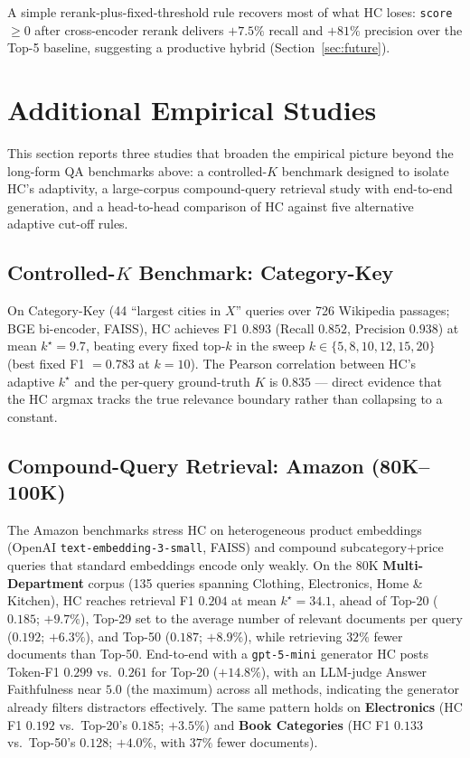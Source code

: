 \documentclass[letterpaper]{article}
\newcommand{\CatHCF}{0.893}
\newcommand{\CatHCR}{0.852}
\newcommand{\CatHCP}{0.938}
\newcommand{\CatHCK}{9.7}
\newcommand{\CatCorrK}{0.835}
\newcommand{\AmMdHCF}{0.204}
\newcommand{\AmMdHCK}{34.1}
\newcommand{\AmMdTwentyF}{0.185}
\newcommand{\AmMdAvgF}{0.192}
\newcommand{\AmMdFiftyF}{0.187}
\newcommand{\AmMdHCTokF}{0.299}
\newcommand{\AmMdTwentyTokF}{0.261}
\newcommand{\AmElHCF}{0.192}
\newcommand{\AmElTwentyF}{0.185}
\newcommand{\AmBkHCF}{0.133}
\newcommand{\AmBkFiftyF}{0.128}
\begin{document}
A simple rerank-plus-fixed-threshold rule recovers most of what HC
loses: \texttt{score $\ge 0$} after cross-encoder rerank delivers
$+7.5\%$ recall and $+81\%$ precision over the Top-5 baseline,
suggesting a productive hybrid (Section~\ref{sec:future}).

\section{Additional Empirical Studies}
\label{sec:prelim}

This section reports three studies that broaden the empirical
picture beyond the long-form QA benchmarks above: a controlled-$K$
benchmark designed to isolate HC's adaptivity, a large-corpus
compound-query retrieval study with end-to-end generation, and a
head-to-head comparison of HC against five alternative adaptive
cut-off rules.

\subsection{Controlled-$K$ Benchmark: Category-Key}
On Category-Key (44 ``largest cities in $X$'' queries over 726
Wikipedia passages; BGE bi-encoder, FAISS), HC achieves F1
$\CatHCF$ (Recall $\CatHCR$, Precision $\CatHCP$) at mean
$k^\star = \CatHCK$, beating every fixed top-$k$ in the sweep
$k \in \{5,8,10,12,15,20\}$ (best fixed F1 $= 0.783$ at $k{=}10$).
The Pearson correlation between HC's adaptive $k^\star$ and the
per-query ground-truth $K$ is $\CatCorrK$ --- direct evidence that
the HC argmax tracks the true relevance boundary rather than
collapsing to a constant.

\subsection{Compound-Query Retrieval: Amazon (80K--100K)}
\label{sec:amazon}
The Amazon benchmarks stress HC on heterogeneous product
embeddings (OpenAI \texttt{text-embedding-3-small}, FAISS) and
compound subcategory$+$price queries that standard embeddings
encode only weakly. On the 80K \textbf{Multi-Department} corpus
(135 queries spanning Clothing, Electronics, Home \& Kitchen), HC
reaches retrieval F1 $\AmMdHCF$ at mean $k^\star = \AmMdHCK$,
ahead of Top-20 ($\AmMdTwentyF$; $+9.7\%$), Top-29 set to the
average number of relevant documents per query ($\AmMdAvgF$;
$+6.3\%$), and Top-50 ($\AmMdFiftyF$; $+8.9\%$), while retrieving
$32\%$ fewer documents than Top-50. End-to-end with a
\texttt{gpt-5-mini} generator HC posts Token-F1 $\AmMdHCTokF$
vs.\ $\AmMdTwentyTokF$ for Top-20 ($+14.8\%$), with an LLM-judge
Answer Faithfulness near $5.0$ (the maximum) across all methods,
indicating the generator already filters distractors effectively.
The same pattern holds on \textbf{Electronics} (HC F1 $\AmElHCF$
vs.\ Top-20's $\AmElTwentyF$; $+3.5\%$) and \textbf{Book
Categories} (HC F1 $\AmBkHCF$ vs.\ Top-50's $\AmBkFiftyF$;
$+4.0\%$, with $37\%$ fewer documents).
\end{document}
